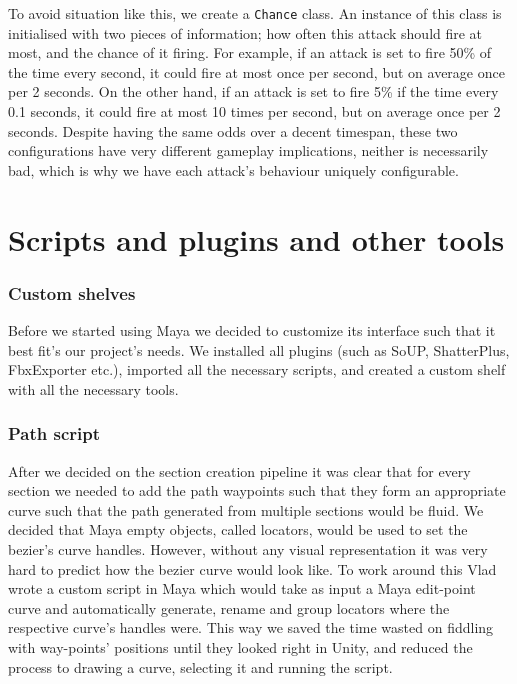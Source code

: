 \documentclass[a4paper,oneside]{memoir}
\begin{document}
			To avoid situation like this, we create a \texttt{Chance} class. 
			An instance of this class is initialised with two pieces of information; how often this attack should fire at most, and the chance of it firing.
			For example, if an attack is set to fire 50\% of the time every second, it could fire at most once per second, but on average once per 2 seconds.
			On the other hand, if an attack is set to fire 5\% if the time every 0.1 seconds, it could fire at most 10 times per second, but on average once per 2 seconds.
			Despite having the same odds over a decent timespan, these two configurations have very different gameplay implications, neither is necessarily bad, which is why we have each attack's behaviour uniquely configurable.

            
            \section{Scripts and plugins and other tools}
            
                \subsubsection{Custom shelves}
                
                    Before we started using Maya we decided to customize its interface such that it best fit's our project's needs. We installed all plugins (such as SoUP, ShatterPlus, FbxExporter etc.), imported all the necessary scripts, and created a custom shelf with all the necessary tools.
            
                \subsubsection{Path script}
                
                    After we decided on the section creation pipeline it was clear that for every section we needed to add the path waypoints such that they form an appropriate curve such that the path generated from multiple sections would be fluid. We decided that Maya empty objects, called locators, would be used to set the bezier's curve handles. However, without any visual representation it was very hard to predict how the bezier curve would look like. To work around this Vlad wrote a custom script in Maya which would take as input a Maya edit-point curve and automatically generate, rename and group locators where the respective curve's handles were. This way we saved the time wasted on fiddling with way-points' positions until they looked right in Unity, and reduced the process to drawing a curve, selecting it and running the script.
                    
\end{document}
